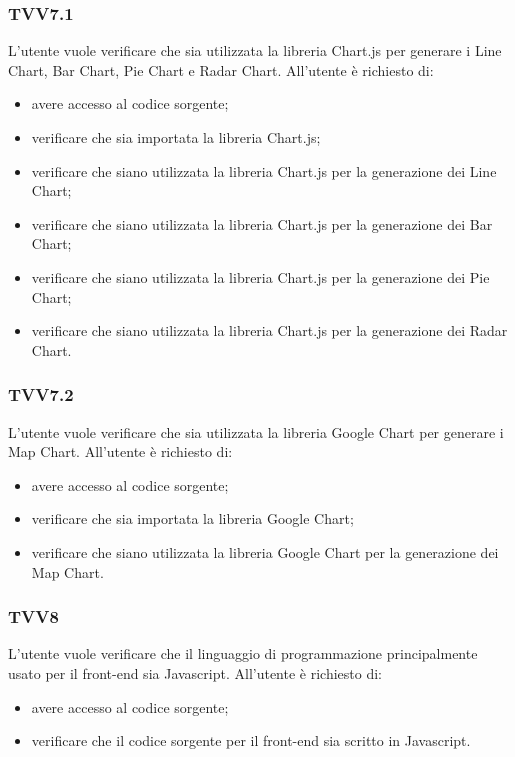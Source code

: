 	\subsubsection{TVV7.1}
			L'utente vuole verificare che sia utilizzata la libreria Chart.js per generare i Line Chart, Bar Chart, Pie Chart e Radar Chart. All'utente è richiesto di:
			\begin{itemize}
				\item avere accesso al codice sorgente;
				\item verificare che sia importata la libreria Chart.js;
				\item verificare che siano utilizzata la libreria Chart.js per la generazione dei Line Chart;
				\item verificare che siano utilizzata la libreria Chart.js per la generazione dei Bar Chart;
				\item verificare che siano utilizzata la libreria Chart.js per la generazione dei Pie Chart;
				\item verificare che siano utilizzata la libreria Chart.js per la generazione dei Radar Chart.
			\end{itemize}
			
		\subsubsection{TVV7.2}
			L'utente vuole verificare che sia utilizzata la libreria Google Chart per generare i Map Chart. All'utente è richiesto di:
			\begin{itemize}
				\item avere accesso al codice sorgente;
				\item verificare che sia importata la libreria Google Chart;
				\item verificare che siano utilizzata la libreria Google Chart per la generazione dei Map Chart.
			\end{itemize}
			
		\subsubsection{TVV8}
			L'utente vuole verificare che il linguaggio di programmazione principalmente usato per il front-end sia Javascript. All'utente è richiesto di:
			\begin{itemize}
				\item avere accesso al codice sorgente;
				\item verificare che il codice sorgente per il front-end sia scritto in Javascript.
			\end{itemize}
			
